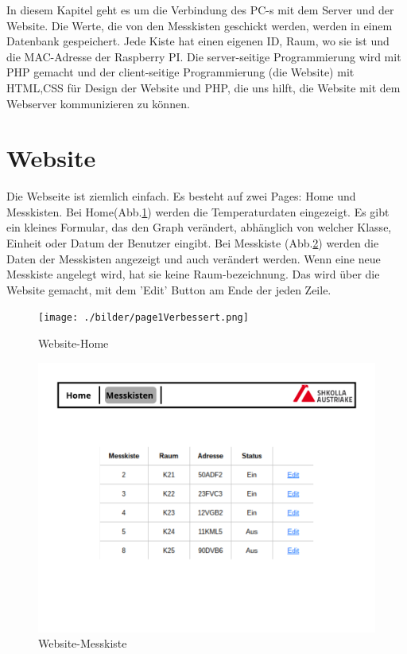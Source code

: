 \pagestyle{fancy}
In diesem Kapitel geht es um die Verbindung des PC-s mit dem Server und der Website.
Die Werte, die von den Messkisten geschickt werden, werden in einem Datenbank gespeichert. Jede Kiste hat einen eigenen ID, Raum, wo sie ist und die MAC-Adresse der Raspberry PI. Die server-seitige Programmierung wird mit PHP gemacht und der client-seitige Programmierung (die Website) mit HTML,CSS f\"ur Design der Website und PHP, die uns hilft, die Website mit dem Webserver kommunizieren zu k\"onnen. 
	\section{Website}
	Die Webseite ist ziemlich einfach. Es besteht auf zwei Pages: Home und Messkisten. 
	Bei Home(Abb.\ref{fi:Web1}) werden die Temperaturdaten eingezeigt. Es gibt ein kleines Formular, das den Graph ver\"andert, abh\"anglich von welcher Klasse, Einheit oder Datum der Benutzer eingibt.	
	Bei Messkiste (Abb.\ref{fi:Web2}) werden die Daten der Messkisten angezeigt und auch ver\"andert werden. Wenn eine neue Messkiste angelegt wird, hat sie keine Raum-bezeichnung. Das wird \"uber die Website gemacht, mit dem 'Edit' Button am Ende der jeden Zeile. 
		\begin{figure}[ht]
		\centering
		\texttt{[image: ./bilder/page1Verbessert.png]}
		\caption{Website-Home}
		\label{fi:Web1}
		\end{figure} 
	\begin{figure}[ht]
		\centering
		\includegraphics[scale=0.4]{./bilder/Page_2.png}
		\caption{Website-Messkiste}
		\label{fi:Web2}
	\end{figure} 
